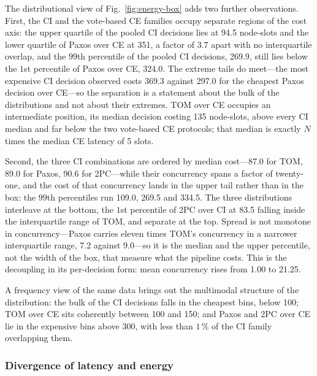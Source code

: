 \documentclass[journal]{IEEEtran}
\newcommand{\CI}{CI}                      %
\newcommand{\CE}{CE}                      %
\newcommand{\Nnodes}{N}                   %
\begin{document}
The distributional view of Fig.~\ref{fig:energy-box} adds two further
observations. First, the \CI{} and
the vote-based \CE{} families occupy separate regions of the cost axis: the
upper quartile of the pooled \CI{} decisions lies at 94.5 node-slots and the
lower quartile of Paxos over \CE{} at 351, a factor of $3.7$ apart with no
interquartile overlap, and the $99$th percentile of the pooled \CI{}
decisions, 269.9, still lies below the $1$st percentile of Paxos over \CE,
324.0. The extreme tails do meet---the most expensive \CI{} decision observed
costs 369.3 against 297.0 for the cheapest Paxos decision over \CE---so the
separation is a statement about the bulk of the distributions and not about
their extremes. TOM over \CE{} occupies an intermediate position, its median
decision costing 135 node-slots, above every \CI{} median and far below the
two vote-based \CE{} protocols; that median is exactly $\Nnodes$ times the
median \CE{} latency of 5 slots.

Second, the three \CI{} combinations are ordered by median cost---87.0 for
TOM, 89.0 for Paxos, 90.6 for 2PC---while their concurrency spans a factor of
twenty-one, and the cost of that concurrency lands in the upper tail rather
than in the box: the $99$th percentiles run 109.0, 269.5 and 334.5. The three
distributions interleave at the bottom, the $1$st percentile of 2PC over \CI{}
at 83.5 falling inside the interquartile range of TOM, and separate at the top.
Spread is not monotone in concurrency---Paxos carries eleven times TOM's
concurrency in a narrower interquartile range, 7.2 against 9.0---so it is the
median and the upper percentile, not the width of the box, that measure what
the pipeline costs. This is the decoupling in its per-decision form: mean
concurrency rises from 1.00 to 21.25.


A frequency view of the same data brings out the multimodal structure of
the distribution: the bulk of the \CI{} decisions falls in the cheapest
bins, below 100; TOM over \CE{} sits coherently between 100 and 150; and
Paxos and 2PC over \CE{} lie in the expensive bins above 300, with less than
$1\,\%$ of the \CI{} family overlapping them.

\subsubsection{Divergence of latency and energy}
\end{document}
